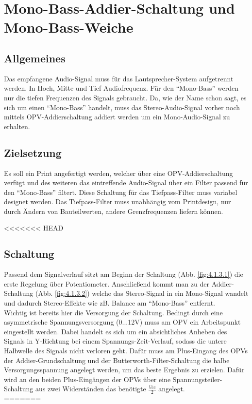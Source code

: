 \section{Mono-Bass-Addier-Schaltung und Mono-Bass-Weiche}\label{sec:4.1}
\subsection{Allgemeines}\label{susec:4.1.1}
Das empfangene Audio-Signal muss für das Lautsprecher-System aufgetrennt werden. In Hoch, Mitte und Tief Audiofrequenz. Für den \enquote{Mono-Bass} werden nur die tiefen Frequenzen des Signals gebraucht. Da, wie der Name schon sagt, es sich um einen \enquote{Mono-Bass} handelt, muss das Stereo-Audio-Signal vorher noch mittels OPV-Addierschaltung addiert werden um ein Mono-Audio-Signal zu erhalten.

\subsection{Zielsetzung}\label{subsec:4.1.2}
Es soll ein Print angefertigt werden, welcher über eine OPV-Addierschaltung verfügt und des weiteren das eintreffende Audio-Signal über ein Filter passend für den \enquote{Mono-Bass} filtert.
Diese Schaltung für das Tiefpass-Filter muss variabel designet werden. Das Tiefpass-Filter muss unabhängig vom Printdesign, nur durch Ändern von Bauteilwerten, andere Grenzfrequenzen liefern können.

<<<<<<< HEAD
\subsection{Schaltung}\label{subsec:4.1.3}
Passend dem Signalverlauf sitzt am Beginn der Schaltung (Abb. \ref{fig:4.1.3.1}) die erste Regelung über Potentiometer. Anschließend kommt man zu der Addier-Schaltung (Abb. \ref{fig:4.1.3.2}) welche das Stereo-Signal in ein Mono-Signal wandelt und dadurch Stereo-Effekte wie zB. Balance am \enquote{Mono-Bass} entfernt.\\
Wichtig ist bereits hier die Versorgung der Schaltung. Bedingt durch eine asymmetrische Spannungsversorgung (0...12V) muss am OPV ein Arbeitspunkt eingestellt werden. Dabei handelt es sich um ein absichtliches Anheben des Signals in Y-Richtung bei einem Spannungs-Zeit-Verlauf, sodass die untere Halbwelle des Signals nicht verloren geht. Dafür muss am Plus-Eingang des OPVs der Addier-Grundschaltung und der Butterworth-Filter-Schaltung die halbe Versorgungsspannung angelegt werden, um das beste Ergebnis zu erzielen. Dafür wird an den beiden Plus-Eingängen der OPVs über eine Spannungsteiler-Schaltung aus zwei Widerständen das benötigte $\frac{Vcc}{2}$ angelegt.\\
=======
